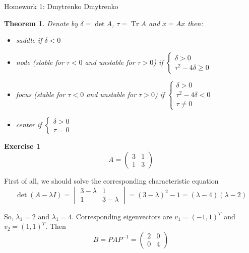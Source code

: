 \documentclass[12pt]{article}
\newtheorem{theorem}{Theorem}
\DeclareMathOperator{\Tr}{Tr}
\begin{document}
    \begin{center}
        Homework 1: Dmytrenko Dmytrenko
    \end{center}

    \begin{theorem}
        Denote by $\delta = \det A$, $\tau = \Tr A$
        and $\dot{x} = Ax$ then:
        \begin{itemize}
            \item saddle if $\delta < 0$
            \item node (stable for $\tau<0$ and
            unstable for $\tau>0$) if 
            $\begin{cases}
                \delta > 0\\
                \tau^2-4\delta\geq 0
            \end{cases}$
            \item focus (stable for $\tau<0$ and
            unstable for $\tau>0$) if 
            $\begin{cases}
                \delta > 0\\
                \tau^2-4\delta < 0\\
                \tau\neq 0
            \end{cases}$
            \item center if  
            $\begin{cases}
                \delta > 0\\
                \tau = 0
            \end{cases}$
        \end{itemize}
    \end{theorem}

    \textbf{Exercise 1}
    $$
        A =
        \begin{pmatrix}
            3 & 1\\
            1 & 3
        \end{pmatrix}
    $$

    First of all, we should solve the corresponding
    characteristic equation
    $$
        \det (A - \lambda I) = 
        \begin{vmatrix}
            3-\lambda & 1\\
            1 & 3-\lambda
        \end{vmatrix}
        = (3-\lambda)^2-1
        =(\lambda-4)(\lambda-2)
    $$

    So, $\lambda_1 = 2$ and $\lambda_1 = 4$. 
    Corresponding eigenvectors are 
    $v_1 = (-1,1)^T$ and $v_2 = (1,1)^T$. Then
    $$
        B = PAP^{-1} =
        \begin{pmatrix}
            2 & 0\\
            0 & 4
        \end{pmatrix}
    $$
\end{document}
